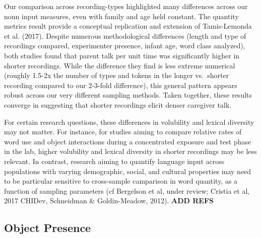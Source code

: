 \documentclass[floatsintext,man]{apa6}
\theoremstyle{definition}
\theoremstyle{definition}
\theoremstyle{definition}
\theoremstyle{remark}
\begin{document}
Our comparison across recording-types highlighted many differences
across our noun input measures, even with family and age held constant.
The quantity metrics result provide a conceptual replication and
extension of Tamis-Lemonda et al. (2017). Despite numerous
methodological differences (length and type of recordings compared,
experimenter presence, infant age, word class analyzed), both studies
found that parent talk per unit time was significantly higher in shorter
recordings. While the difference they find is less extreme numerical
(roughly 1.5-2x the number of types and tokens in the longer vs.~shorter
recording compared to our 2-3-fold difference), this general pattern
appears robust across our very different sampling methods. Taken
together, these results converge in suggesting that shorter recordings
elicit denser caregiver talk.

For certain research questions, these differences in volubility and
lexical diversity may not matter. For instance, for studies aiming to
compare relative rates of word use and object interactions during a
concentrated exposure and test phase in the lab, higher volubility and
lexical diversity in shorter recordings may be less relevant. In
contrast, research aiming to quantify language input across populations
with varying demographic, social, and cultural properties may need to be
particular sensitive to cross-sample camparison in word quantity, as a
function of sampling parameters (cf Bergelson et al, under review;
Cristia et al, 2017 CHIDev, Schneidman \& Goldin-Meadow, 2012).
\textbf{ADD REFS}

\subsection{Object Presence}\label{object-presence}
\end{document}
